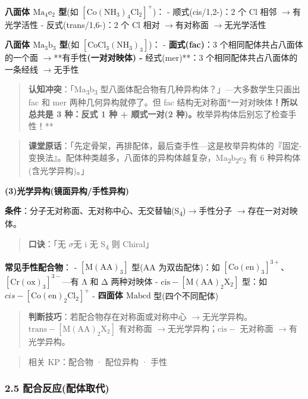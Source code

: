 \documentclass[a4paper,11pt]{ctexart}
\newcommand{\箭}{\ensuremath{\rightarrow}}
\newcommand{\左箭}{\ensuremath{\leftarrow}}
\newcommand{\上箭}{\ensuremath{\uparrow}}
\newcommand{\下箭}{\ensuremath{\downarrow}}
\newcommand{\衡}{\ensuremath{\rightleftharpoons}}
\newcommand{\双箭}{\ensuremath{\leftrightarrow}}
\newcommand{\约等于}{\ensuremath{\approx}}
\newcommand{\小于等于}{\ensuremath{\leq}}
\newcommand{\大于等于}{\ensuremath{\geq}}
\newcommand{\不等于}{\ensuremath{\neq}}
\newcommand{\西格马}{\ensuremath{\sigma}}
\newcommand{\派}{\ensuremath{\pi}}
\begin{document}
\textbf{八面体 \(\mathrm{Ma_4e_2}\) 型}(如 \([\mathrm{Co(NH_3)_4Cl_2}]^+\))：
- 顺式(cis/1,2-)：2 个 Cl 相邻 \箭 有光学活性
- 反式(trans/1,6-)：2 个 Cl 相对 \箭 有对称面 \箭 无光学活性

\textbf{八面体 \(\mathrm{Ma_3b_3}\) 型}(如 \([\mathrm{CoCl_3(NH_3)_3}]\))：
- \textbf{面式(fac)}：3 个相同配体共占八面体的一个面 \箭 **有手性\textbf{(一对对映体)
- }经式(mer)**：3 个相同配体共占八面体的一条经线 \箭 无手性

\begin{quote}
\textbf{认知冲突}：「Ma\textsubscript{3}b\textsubscript{3} 型八面体配合物有几种异构体？」---大多数学生只画出 fac 和 mer 两种几何异构就停了。但 fac 结构无对称面*一对对映体\textbf{！所以总共是 3 种：反式 1 种 + 顺式一对(2 种)。}枚举异构体后别忘了检查手性！**
\end{quote}

\begin{quote}
\textbf{课堂原话}：「先定骨架，再排配体，最后查手性---这是枚举异构体的『固定-变换法』。配体种类越多，八面体的异构体越复杂，Ma\textsubscript{2}b\textsubscript{2}c\textsubscript{2} 有 6 种异构体(含光学异构)。」
\end{quote}

\textbf{(3)光学异构(镜面异构/手性异构)}

\textbf{条件}：分子无对称面、无对称中心、无交替轴(S\textsubscript{4})\箭 手性分子 \箭 存在一对对映体。

\begin{quote}
\textbf{口诀}：「无 \西格马 无 i 无 S\textsubscript{4} 则 Chiral」
\end{quote}

\textbf{常见手性配合物}：
- \(\mathrm{[M(AA)_3]}\) 型(AA 为双齿配体)：如 \([\mathrm{Co(en)_3}]^{3+}\)、\([\mathrm{Cr(ox)_3}]^{3-}\)---有 Λ 和 Δ 两种对映体
- \(\mathrm{cis-[M(AA)_2X_2]}\) 型：如 \(cis-[\mathrm{Co(en)_2Cl_2}]^+\)
- \textbf{四面体 \(\mathrm{Mabcd}\)} 型(四个不同配体)

\begin{quote}
\textbf{判断技巧}：若配合物存在对称面或对称中心 \箭 无光学异构。\(\mathrm{trans-[M(AA)_2X_2]}\) 有对称面 \箭 无光学异构；\(\mathrm{cis-}\) 无对称面 \箭 有光学异构。
\end{quote}

\begin{quote}
相关 KP：配合物 · 配位异构 · 手性
\end{quote}

\subsubsection{2.5 配合反应(配体取代)}\label{ux914dux5408ux53cdux5e94ux914dux4f53ux53d6ux4ee3}
\end{document}
